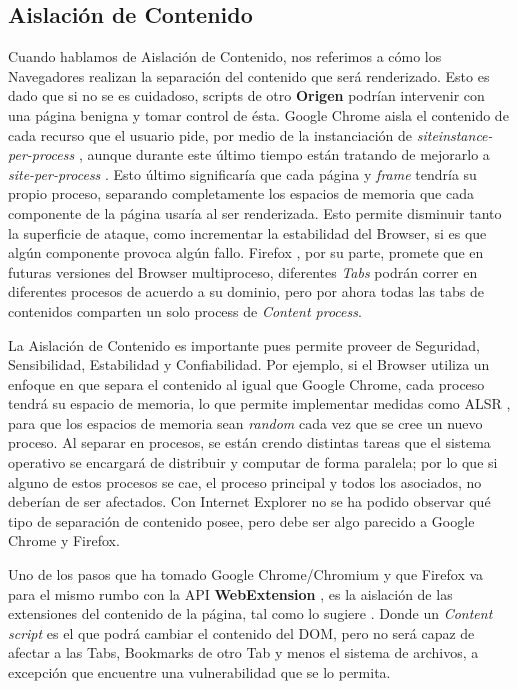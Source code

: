  \subsection{Aislación de Contenido}
    Cuando hablamos de Aislación de Contenido, nos referimos a cómo los Navegadores realizan la separación del contenido que será renderizado. Esto es dado que si no se es cuidadoso, scripts de otro \textbf{Origen} podrían intervenir con una página benigna y tomar control de ésta. Google Chrome aisla el contenido de cada recurso que el usuario pide, por medio de la instanciación de \textit{siteinstance-per-process} \cite{Reis2009}, aunque durante este último tiempo están tratando de mejorarlo a \textit{site-per-process} \cite{GoogleChromeIsolation}. Esto último significaría que cada página y \textit{frame} tendría su propio proceso, separando completamente los espacios de memoria que cada componente de la página usaría al ser renderizada. Esto permite disminuir tanto la superficie de ataque, como incrementar la estabilidad del Browser, si es que algún componente provoca algún fallo. Firefox \cite{FirefoxThreatModel}, por su parte, promete que en futuras versiones del Browser multiproceso, diferentes \textit{Tabs} podrán correr en diferentes procesos de acuerdo a su dominio, pero por ahora todas las tabs de contenidos comparten un solo process de \textit{Content process}.

    La Aislación de Contenido es importante pues permite proveer de Seguridad, Sensibilidad, Estabilidad y Confiabilidad. Por ejemplo, si el Browser utiliza un enfoque en que separa el contenido al igual que Google Chrome, cada proceso tendrá su espacio de memoria, lo que permite implementar medidas como ALSR \cite{Drake2011}, para que los espacios de memoria sean \textit{random} cada vez que se cree un nuevo proceso. Al separar en procesos, se están crendo distintas tareas que el sistema operativo se encargará de distribuir y computar de forma paralela; por lo que si alguno de estos procesos se cae, el proceso principal y todos los asociados, no deberían de ser afectados. Con Internet Explorer no se ha podido observar qué tipo de separación de contenido posee, pero debe ser algo parecido a Google Chrome y Firefox.
    
    Uno de los pasos que ha tomado Google Chrome/Chromium y que Firefox va para el mismo rumbo con la API \textbf{WebExtension} \cite{AddONFirefox}, es la aislación de las extensiones del contenido de la página, tal como lo sugiere \cite{Barth2010}. Donde un \textit{Content script} es el que podrá cambiar el contenido del DOM, pero no será capaz de afectar a las Tabs, Bookmarks de otro Tab y menos el sistema de archivos, a excepción que encuentre una vulnerabilidad que se lo permita.
    

